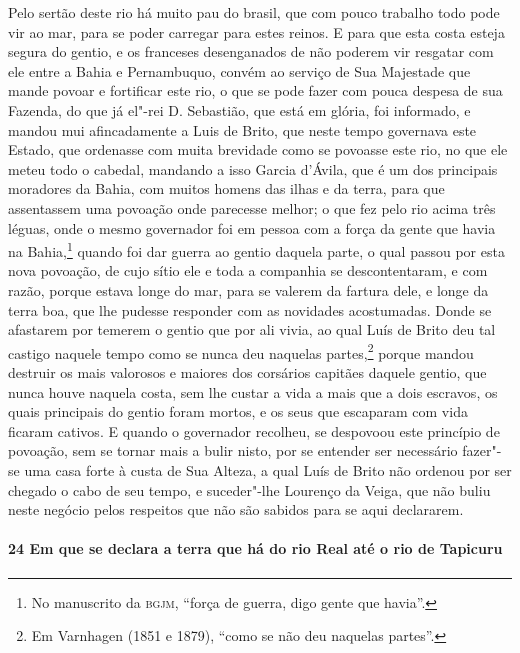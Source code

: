 Pelo sertão deste rio há muito pau do brasil, que com pouco trabalho todo pode vir ao mar,
para se poder carregar para estes reinos. E para que esta costa esteja segura do gentio, e
os franceses desenganados de não poderem vir resgatar com ele entre a Bahia e Pernambuquo,
convém ao serviço de Sua Majestade que mande povoar e fortificar este rio, o que se pode
fazer com pouca despesa de sua Fazenda, do que já el"-rei D. Sebastião, que está em glória,
foi informado, e mandou mui afincadamente a Luis de Brito, que neste tempo governava este
Estado, que ordenasse com muita brevidade como se povoasse este rio, no que ele meteu todo
o cabedal, mandando a isso Garcia d'Ávila, que é um dos principais moradores da Bahia, com
muitos homens das ilhas e da terra, para que assentassem uma povoação onde parecesse
melhor; o que fez pelo rio acima três léguas, onde o mesmo governador foi em pessoa com a
força da gente que havia na Bahia,\footnote{ No manuscrito da \textsc{bgjm}, ``força de
guerra, digo gente que havia''.} quando foi dar guerra ao gentio daquela parte, o qual
passou por esta nova povoação, de cujo sítio ele e toda a companhia se descontentaram, e
com razão, porque estava longe do mar, para se valerem da fartura dele, e longe da terra
boa, que lhe pudesse responder com as novidades acostumadas. Donde se afastarem por
temerem o gentio que por ali vivia, ao qual Luís de Brito deu tal castigo naquele tempo
como se nunca deu naquelas partes,\footnote{ Em Varnhagen (1851 e 1879), ``como se não deu
naquelas partes''.} porque mandou destruir os mais valorosos e maiores dos corsários
capitães daquele gentio, que nunca houve naquela costa, sem lhe custar a vida a mais que a
dois escravos, os quais principais do gentio foram mortos, e os seus que escaparam com
vida ficaram cativos. E quando o governador recolheu, se despovoou este princípio de
povoação, sem se tornar mais a bulir nisto, por se entender ser necessário fazer"-se uma
casa forte à custa de Sua Alteza, a qual Luís de Brito não ordenou por ser chegado o cabo
de seu tempo, e suceder"-lhe Lourenço da Veiga, que não buliu neste negócio pelos respeitos
que não são sabidos para se aqui declararem.

\paragraph{24 Em que se declara a terra que há do rio Real até o rio de Tapicuru}

